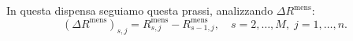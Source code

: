 \documentclass[11pt,a4paper]{article}
\theoremstyle{plain}
\theoremstyle{definition}
\theoremstyle{remark}
\newtheorem*{osservazione}{Osservazione}
\begin{document}

In questa
dispensa seguiamo questa prassi, analizzando $\Delta R^{\text{mens}}$:
\[
(\Delta R^{\text{mens}})_{s,j} = R^{\text{mens}}_{s,j} - R^{\text{mens}}_{s-1,j},
\quad s = 2,\ldots,M,\; j = 1,\ldots,n.
\]


\medskip


\end{document}
